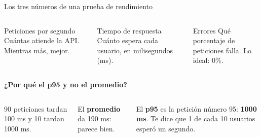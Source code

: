 \documentclass[aspectratio=169,10pt,c]{beamer}
\newcommand{\num}[1]{\textcolor{utpRojo}{\ding{#1}}}
\begin{document}
\begin{frame}{Los tres números de una prueba de rendimiento}
\begin{columns}[T,onlytextwidth]
\begin{block}{\num{202} Peticiones por segundo}
\small Cuántas atiende la API. Mientras más, mejor.
\end{block}
\begin{block}{\num{203} Tiempo de respuesta}
\small Cuánto espera cada usuario, en milisegundos (ms).
\end{block}
\begin{block}{\num{204} Errores}
\small Qué porcentaje de peticiones falla. Lo ideal: 0\%.
\end{block}
\end{columns}
\vspace{3mm}
\textbf{\small ¿Por qué el p95 y no el promedio?}\par\smallskip
\begin{columns}[T,onlytextwidth]
\small 90 peticiones tardan 100 ms y 10 tardan 1000 ms.\par\medskip
El \textbf{promedio} da 190 ms: parece bien.\par\medskip
El \textbf{p95} es la petición número 95: \textbf{1000 ms}. Te dice que 1 de cada 10 usuarios esperó un segundo.
\end{columns}
\end{frame}
\end{document}
